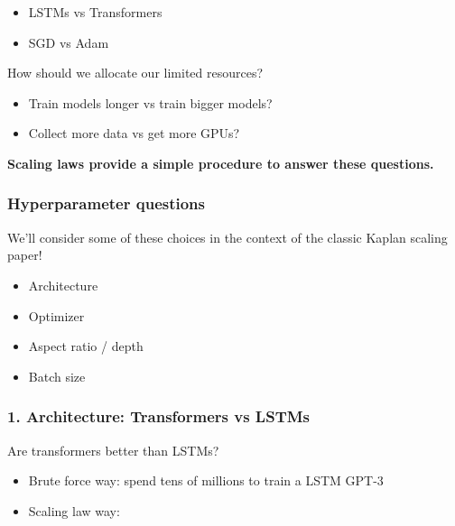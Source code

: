 \documentclass[12pt,twoside]{article}
\begin{document}
\begin{itemize}
    \item LSTMs vs Transformers
    \item SGD vs Adam
\end{itemize}

\begin{question}
    How should we allocate our limited resources?
\end{question}

\begin{itemize}
    \item Train models longer vs train bigger models?
    \item Collect more data vs get more GPUs?
\end{itemize}

\begin{center}
    \textbf{Scaling laws provide a simple procedure to answer these questions.}
\end{center}

\subsubsection*{Hyperparameter questions}

We'll consider some of these choices in the context of the classic Kaplan scaling paper!

\begin{itemize}
    \item Architecture
    \item Optimizer
    \item Aspect ratio / depth
    \item Batch size
\end{itemize}

\subsubsection*{1. Architecture: Transformers vs LSTMs}

\begin{question}
    Are transformers better than LSTMs?
\end{question}

\begin{itemize}
    \item Brute force way: spend tens of millions to train a LSTM GPT-3
    \item Scaling law way:
\end{itemize}
\end{document}
